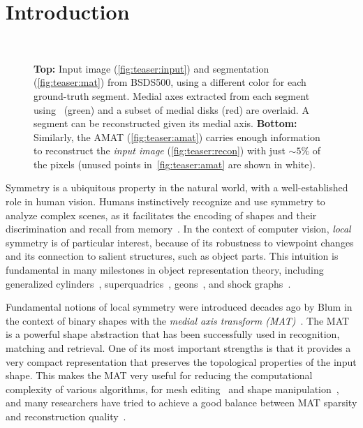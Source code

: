 \documentclass[10pt,twocolumn,letterpaper]{article}
\begin{document}
\section{Introduction}\label{sec:introduction}
\begin{figure}[!t]
\centering
{}
 \\
\caption{\textbf{Top:} Input image (\ref{fig:teaser:input}) and segmentation (\ref{fig:teaser:mat}) from BSDS500,
using a different color for each ground-truth segment. 
Medial axes extracted from each segment using~\cite{telea2002augmented} (green) and a subset of medial disks (red) are overlaid. 
A segment can be reconstructed given its medial axis. 
\textbf{Bottom:} Similarly, the AMAT (\ref{fig:teaser:amat}) carries enough information to reconstruct the 
 \emph{input image} (\ref{fig:teaser:recon}) with just $\sim 5\%$ of the pixels 
 (unused points in~\ref{fig:teaser:amat} are shown in white).}
\label{fig:teaser}
\end{figure}

Symmetry is a ubiquitous property in the natural world, with a well-established role in human vision.
Humans instinctively recognize and use symmetry to analyze complex scenes, as it facilitates the encoding of shapes and
their discrimination and recall from memory~\cite{barlow1979versatility,royer1981detection,wagemans1998parallel}.
In the context of computer vision, \emph{local} symmetry is of particular interest, 
because of its robustness to viewpoint changes and its connection to salient structures, such as object parts.
This intuition is fundamental in many milestones in object representation theory, including generalized
cylinders~\cite{binford1971visual}, superquadrics~\cite{barr1981superquadrics}, 
geons~\cite{biederman1987recognition}, and shock graphs~\cite{siddiqi1999shock}.

Fundamental notions of local symmetry were introduced decades ago by Blum in the context 
of binary shapes with the \emph{medial axis transform (MAT)}~\cite{blum1967transformation,blum1973biological}.
The MAT is a powerful shape abstraction that has been successfully used in recognition, matching and retrieval. 
One of its most important strengths is that it provides a very compact representation that preserves the topological
properties of the input shape.
This makes the MAT very useful for reducing the computational complexity of various algorithms,
\eg for mesh editing~\cite{li2001decomposing,yoshizawa2003free} and shape manipulation~\cite{du2004medial},
and many researchers have tried to achieve a good balance
between MAT sparsity and reconstruction quality~\cite{tam2003shape,li2015q}.
\end{document}
